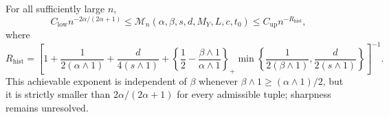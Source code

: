 For all sufficiently large \(n\), \[C_{\mathrm{low}}n^{-2\alpha/(2\alpha+1)}\le \mathcal M_n(\alpha,\beta,s,d,M_Y,L,c,t_0)\le C_{\mathrm{up}}n^{-R_{\mathrm{hist}}},\] where \[R_{\mathrm{hist}}=\left[1+\frac1{2(\alpha\wedge1)}+\frac d{4(s\wedge1)}+\left\{\frac12-\frac{\beta\wedge1}{\alpha\wedge1}\right\}_+\min\left\{\frac1{2(\beta\wedge1)},\frac d{2(s\wedge1)}\right\}\right]^{-1}.\] This achievable exponent is independent of \(\beta\) whenever \(\beta\wedge1\ge(\alpha\wedge1)/2\), but it is strictly smaller than \(2\alpha/(2\alpha+1)\) for every admissible tuple; sharpness remains unresolved.